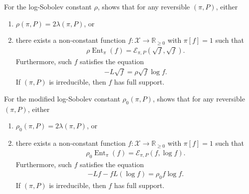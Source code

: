 \documentclass[11pt]{article}
\def\bR{\mathbb{R}}
\def\cE{\mathcal{E}}
\def\cX{\mathcal{X}}
\DeclareMathOperator\Ent{\mathrm{Ent}}
\theoremstyle{definition}
\begin{document}
For the log-Sobolev constant $\rho$, \cite{bobkov2006modified} shows that for any reversible $(\pi, P)$, either
\begin{enumerate}[label=(\roman*)]
  \item $\rho(\pi, P) = 2 \lambda(\pi, P)$, or
  \item there exists a non-constant function $f: \cX \to \bR_{\ge 0}$ with $\pi[f]=1$ such that
  \begin{align}
    \rho \Ent_\pi(f) = \cE_{\pi,P}(\sqrt f, \sqrt f).
  \end{align}
  Furthermore, such $f$ satisfies the equation
  \begin{align}
    -L\sqrt f = \rho \sqrt f \log f.
  \end{align}
  If $(\pi, P)$ is irreducible, then $f$ has full support.
\end{enumerate}

For the modified log-Sobolev constant $\rho_0(\pi, P)$, \cite{bobkov2006modified} shows that for any reversible $(\pi, P)$, either
\begin{enumerate}[label=(\roman*)]
  \item $\rho_0(\pi, P) = 2 \lambda(\pi, P)$, or
  \item there exists a non-constant function $f: \cX \to \bR_{\ge 0}$ with $\pi[f]=1$ such that
  \begin{align}
    \rho_0 \Ent_\pi(f) = \cE_{\pi,P}(f, \log f).
  \end{align}
  Furthermore, such $f$ satisfies the equation
  \begin{align}
    -Lf -f L(\log f)=\rho_0 f \log f.
  \end{align}
  If $(\pi, P)$ is irreducible, then $f$ has full support.
\end{enumerate}
\end{document}
